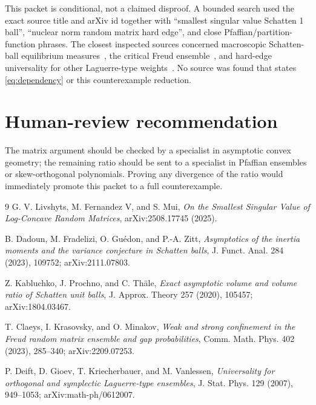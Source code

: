 \documentclass[11pt]{article}
\begin{document}
This packet is conditional, not a claimed disproof.  A bounded search used the
exact source title and arXiv id together with ``smallest singular value
Schatten 1 ball'', ``nuclear norm random matrix hard edge'', and close
Pfaffian/partition-function phrases.  The closest inspected sources concerned
macroscopic Schatten-ball equilibrium measures~\cite{DFGZ,KPT}, the critical
Freud ensemble~\cite{CKM}, and hard-edge universality for other Laguerre-type
weights~\cite{DGKV}.  No source was found that states \eqref{eq:dependency} or
this counterexample reduction.

\section*{Human-review recommendation}

The matrix argument should be checked by a specialist in asymptotic convex
geometry; the remaining ratio should be sent to a specialist in Pfaffian
ensembles or skew-orthogonal polynomials.  Proving any divergence of the ratio
would immediately promote this packet to a full counterexample.

\begin{thebibliography}{9}
G. V. Livshyts, M. Fernandez V, and S. Mui,
\emph{On the Smallest Singular Value of Log-Concave Random Matrices},
arXiv:2508.17745 (2025).

B. Dadoun, M. Fradelizi, O. Gu\'edon, and P.-A. Zitt,
\emph{Asymptotics of the inertia moments and the variance conjecture in
Schatten balls}, J. Funct. Anal. 284 (2023), 109752; arXiv:2111.07803.

Z. Kabluchko, J. Prochno, and C. Th\"ale,
\emph{Exact asymptotic volume and volume ratio of Schatten unit balls},
J. Approx. Theory 257 (2020), 105457; arXiv:1804.03467.

T. Claeys, I. Krasovsky, and O. Minakov,
\emph{Weak and strong confinement in the Freud random matrix ensemble and
gap probabilities}, Comm. Math. Phys. 402 (2023), 285--340;
arXiv:2209.07253.

P. Deift, D. Gioev, T. Kriecherbauer, and M. Vanlessen,
\emph{Universality for orthogonal and symplectic Laguerre-type ensembles},
J. Stat. Phys. 129 (2007), 949--1053; arXiv:math-ph/0612007.
\end{thebibliography}
\end{document}

